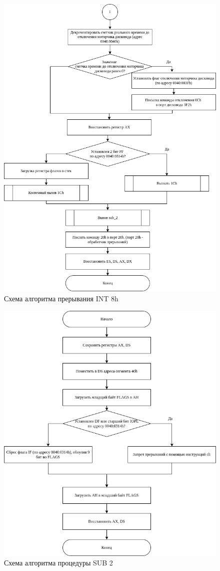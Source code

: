 \begin{figure}[h!]
	\begin{center}
		\includegraphics[scale=0.7]{../../INT8_END.drawio.png}
		\caption{Схема алгоритма прерывания INT 8h}
	\end{center}
\end{figure}

\begin{figure}[h!]
	\begin{center}
		\includegraphics[scale=0.7]{../../SUB2.drawio.png}
		\caption{Схема алгоритма процедуры SUB 2}
	\end{center}
\end{figure}